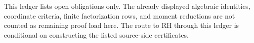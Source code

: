 \begin{principle}
\label{prin:rh-unresolved-projection-ledger-status}
This ledger lists open obligations only. The already displayed algebraic
identities, coordinate criteria, finite factorization rows, and moment
reductions are not counted as remaining proof load here. The route to RH
through this ledger is conditional on constructing the listed source-side
certificates.
\end{principle}
